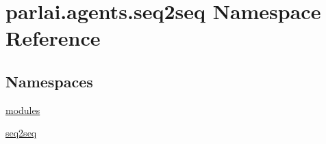 \hypertarget{namespaceparlai_1_1agents_1_1seq2seq}{}\section{parlai.\+agents.\+seq2seq Namespace Reference}
\label{namespaceparlai_1_1agents_1_1seq2seq}
\subsection*{Namespaces}
\begin{DoxyCompactItemize}
\item 
 \hyperlink{namespaceparlai_1_1agents_1_1seq2seq_1_1modules}{modules}
\item 
 \hyperlink{namespaceparlai_1_1agents_1_1seq2seq_1_1seq2seq}{seq2seq}
\end{DoxyCompactItemize}
